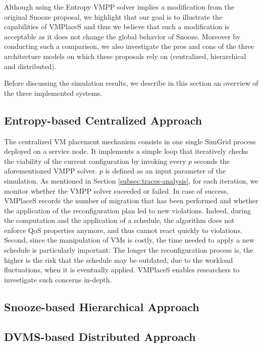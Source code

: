 \documentclass[conference]{IEEEtran}
\newcommand{\sg}{SimGrid\xspace}
\newcommand{\vmps}{VMPlaceS\xspace}
\begin{document}
%
Although using the Entropy VMPP solver
implies a modification from the original Snooze proposal,  we
highlight that our goal is to illustrate the capabilities of \vmps and
thus we believe that such a modification is acceptable as it does not
change the global behavior of Snooze. Moreover by
conducting such a comparison, we also investigate the pros and cons of
the three  architecture models on which these proposals rely on (\ie centralized, hierarchical and
distributed).

%
Before discussing the simulation results, we
describe in this section an overview of the three implemented systems.

\subsection{Entropy-based Centralized Approach}
\label{subsec:entropy}
The centralized VM placement mechanism consists in one single \sg
process deployed on a service node. It implements a simple loop that
iteratively checks the viability of the current configuration by
invoking every $p$ seconds the aforementioned VMPP solver. $p$ is
defined as an input parameter of the simulation. As mentioned in
Section \ref{subsec:traces-analysis}, for each iteration, we monitor
whether the VMPP solver suceeded or failed. In case of success, \vmps
records the number of migration that has been performed and whether
the application of the reconfiguration plan led to new violations.
 Indeed, during
the computation and the application of a schedule, the algorithm does
not enforce QoS properties anymore, and thus cannot react quickly to
violations. Second, since the manipulation of VMs is costly, the time
needed to apply a new schedule is particularly important: The longer
the reconfiguration process is, the higher is the risk that the schedule may
be outdated, due to the workload fluctuations, when it is eventually
applied.
\vmps enables researchers to investigate such concerns in-depth.


\subsection{Snooze-based Hierarchical Approach}
\label{subsec:snooze}


\subsection{DVMS-based Distributed Approach}
\label{subsec:dvms}

\end{document}
